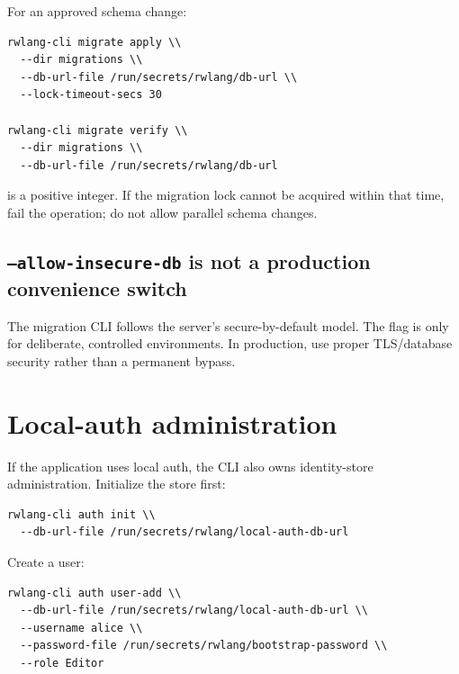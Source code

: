 For an approved schema change:

\begin{lstlisting}
rwlang-cli migrate apply \\
  --dir migrations \\
  --db-url-file /run/secrets/rwlang/db-url \\
  --lock-timeout-secs 30

rwlang-cli migrate verify \\
  --dir migrations \\
  --db-url-file /run/secrets/rwlang/db-url
\end{lstlisting}

 is a positive integer. If the migration lock cannot be acquired within that time, fail the operation; do not allow parallel schema changes.

\subsection*{\texttt{--allow-insecure-db} is not a production convenience switch}

The migration CLI follows the server's secure-by-default model. The  flag is only for deliberate, controlled environments. In production, use proper TLS/database security rather than a permanent bypass.

\section{Local-auth administration}

If the application uses local auth, the CLI also owns identity-store administration. Initialize the store first:

\begin{lstlisting}
rwlang-cli auth init \\
  --db-url-file /run/secrets/rwlang/local-auth-db-url
\end{lstlisting}

Create a user:

\begin{lstlisting}
rwlang-cli auth user-add \\
  --db-url-file /run/secrets/rwlang/local-auth-db-url \\
  --username alice \\
  --password-file /run/secrets/rwlang/bootstrap-password \\
  --role Editor
\end{lstlisting}

